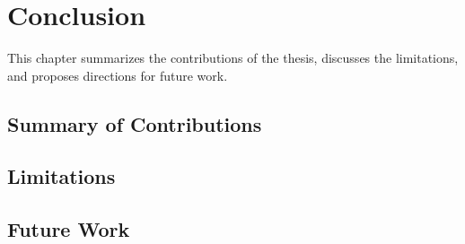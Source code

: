 \section{Conclusion}
\label{ch:conclusion}

This chapter summarizes the contributions of the thesis, discusses the limitations, and proposes directions for future work.

\subsection{Summary of Contributions}

\subsection{Limitations}

\subsection{Future Work}
